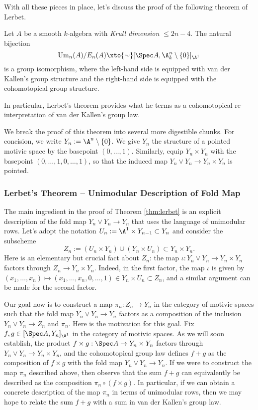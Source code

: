 With all these pieces in place, let's discuss the proof of the following theorem of Lerbet.

\begin{theorem}[Lerbet, 2024]\label{thm:lerbet}
    Let $A$ be a smooth $k$-algebra with \textit{Krull dimension} $\leq 2n-4$. The natural bijection
    \[
    \mathrm{Um}_n(A)/E_n(A) \xto{\sim} [\Spec A, \A^n_k\setminus\{0\}]_{\A^1}
    \]
    is a group isomorphism, where the left-hand side is equipped with van der Kallen's group structure and the right-hand side is equipped with the cohomotopical group structure. 
\end{theorem}

In particular, Lerbet's theorem provides what he terms as a cohomotopical re-interpretation of van der Kallen's group law. 

We break the proof of this theorem into several more digestible chunks. For concision, we write $Y_n := \A^n \setminus\{0\}$. We give $Y_n$ the structure of a pointed motivic space by the basepoint $(0,\ldots,1)$. Similarly, equip $Y_n \times Y_n$ with the basepoint $(0,\ldots,1,0,\ldots,1)$, so that the induced map $Y_n \vee Y_n \to Y_n \times Y_n$ is pointed. 

\subsubsection{Lerbet's Theorem -- Unimodular Description of Fold Map}\label{subsec:lerbet_unimodular}

The main ingredient in the proof of Theorem \ref{thm:lerbet} is an explicit description of the fold map $Y_n \vee Y_n \to Y_n$ that uses the language of unimodular rows. Let's adopt the notation $U_n := \A^1 \times Y_{n-1} \subset Y_n$ and consider the subscheme
\[
Z_n := (U_n \times Y_n) \cup (Y_n  \times U_n)\subset Y_n \times Y_n.
\]
Here is an elementary but crucial fact about $Z_n$: the map $\iota: Y_n \vee Y_n \to Y_n \times Y_n$ factors through $Z_n \to Y_n \times Y_n$. Indeed, in the first factor, the map $\iota$ is given by $(x_1,\ldots,x_n) \mapsto (x_1,\ldots,x_n,0,\ldots,1) \in Y_n \times U_n \subset Z_n$, and a similar argument can be made for the second factor. 

Our goal now is to construct a map $\pi_n: Z_n \to Y_n$ in the category of motivic spaces such that the fold map $Y_n \vee Y_n \to Y_n$ factors as a composition of the inclusion $Y_n \vee Y_n \to Z_n$ and $\pi_n$. Here is the motivation for this goal. Fix $f,g \in [\Spec A, Y_n]_{\A^1}$ in the category of motivic spaces. As we will soon establish, the product $f \times g: \Spec A \to Y_n \times Y_n$ factors through $Y_n \vee Y_n \to Y_n \times Y_n$, and the cohomotopical group law defines $f + g$ as the composition of $f \times g$ with the fold map $Y_n \vee Y_n \to Y_n$. If we were to construct the map $\pi_n$ described above, then observe that the sum $f + g$ can equivalently be described as the composition $\pi_{n} \circ (f \times g)$. In particular, if we can obtain a concrete description of the map $\pi_n$ in terms of unimodular rows, then we may hope to relate the sum $f + g$ with a sum in van der Kallen's group law. 

